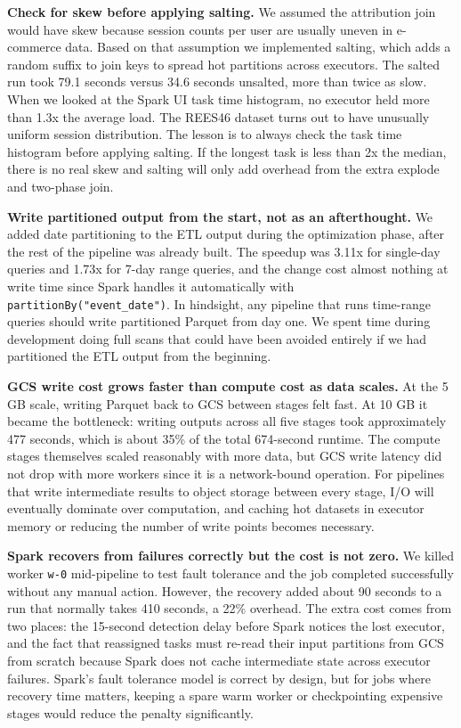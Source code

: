 \documentclass[letterpaper,twocolumn,10pt]{article}
\begin{document}
\textbf{Check for skew before applying salting.}
We assumed the attribution join would have skew because session counts per user
are usually uneven in e-commerce data. Based on that assumption we implemented
salting, which adds a random suffix to join keys to spread hot partitions across
executors. The salted run took 79.1 seconds versus 34.6 seconds unsalted, more
than twice as slow. When we looked at the Spark UI task time histogram, no
executor held more than 1.3x the average load. The REES46 dataset turns out to
have unusually uniform session distribution. The lesson is to always check the
task time histogram before applying salting. If the longest task is less than 2x
the median, there is no real skew and salting will only add overhead from the
extra explode and two-phase join.

\textbf{Write partitioned output from the start, not as an afterthought.}
We added date partitioning to the ETL output during the optimization phase, after
the rest of the pipeline was already built. The speedup was 3.11x for single-day
queries and 1.73x for 7-day range queries, and the change cost almost nothing at
write time since Spark handles it automatically with \texttt{partitionBy("event\_date")}.
In hindsight, any pipeline that runs time-range queries should write partitioned
Parquet from day one. We spent time during development doing full scans that
could have been avoided entirely if we had partitioned the ETL output from the
beginning.

\textbf{GCS write cost grows faster than compute cost as data scales.}
At the 5 GB scale, writing Parquet back to GCS between stages felt fast. At 10 GB
it became the bottleneck: writing outputs across all five stages took approximately
477 seconds, which is about 35\% of the total 674-second runtime. The compute
stages themselves scaled reasonably with more data, but GCS write latency did not
drop with more workers since it is a network-bound operation. For pipelines that
write intermediate results to object storage between every stage, I/O will
eventually dominate over computation, and caching hot datasets in executor memory
or reducing the number of write points becomes necessary.

\textbf{Spark recovers from failures correctly but the cost is not zero.}
We killed worker \texttt{w-0} mid-pipeline to test fault tolerance and the job
completed successfully without any manual action. However, the recovery added
about 90 seconds to a run that normally takes 410 seconds, a 22\% overhead.
The extra cost comes from two places: the 15-second detection delay before
Spark notices the lost executor, and the fact that reassigned tasks must re-read
their input partitions from GCS from scratch because Spark does not cache
intermediate state across executor failures. Spark's fault tolerance model is
correct by design, but for jobs where recovery time matters, keeping a spare
warm worker or checkpointing expensive stages would reduce the penalty
significantly.
\end{document}
